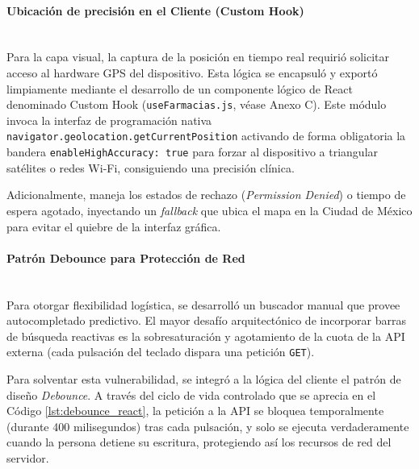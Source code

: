 \paragraph{Ubicación de precisión en el Cliente (Custom Hook)}\leavevmode \\
Para la capa visual, la captura de la posición en tiempo real requirió solicitar acceso al hardware GPS del dispositivo. Esta lógica se encapsuló y exportó limpiamente mediante el desarrollo de un componente lógico de React denominado Custom Hook (\texttt{useFarmacias.js}, véase Anexo C). Este módulo invoca la interfaz de programación nativa \texttt{navigator.geolocation.getCurrentPosition} activando de forma obligatoria la bandera \texttt{enableHighAccuracy: true} para forzar al dispositivo a triangular satélites o redes Wi-Fi, consiguiendo una precisión clínica.

Adicionalmente, maneja los estados de rechazo (\emph{Permission Denied}) o tiempo de espera agotado, inyectando un \emph{fallback} que ubica el mapa en la Ciudad de México para evitar el quiebre de la interfaz gráfica.

\paragraph{Patrón Debounce para Protección de Red} \leavevmode \\
Para otorgar flexibilidad logística, se desarrolló un buscador manual que provee autocompletado predictivo. El mayor desafío arquitectónico de incorporar barras de búsqueda reactivas es la sobresaturación y agotamiento de la cuota de la API externa (cada pulsación del teclado dispara una petición \texttt{GET}). 

Para solventar esta vulnerabilidad, se integró a la lógica del cliente el patrón de diseño \emph{Debounce}. A través del ciclo de vida controlado que se aprecia en el Código \ref{lst:debounce_react}, la petición a la API se bloquea temporalmente (durante 400 milisegundos) tras cada pulsación, y solo se ejecuta verdaderamente cuando la persona detiene su escritura, protegiendo así los recursos de red del servidor. \\

